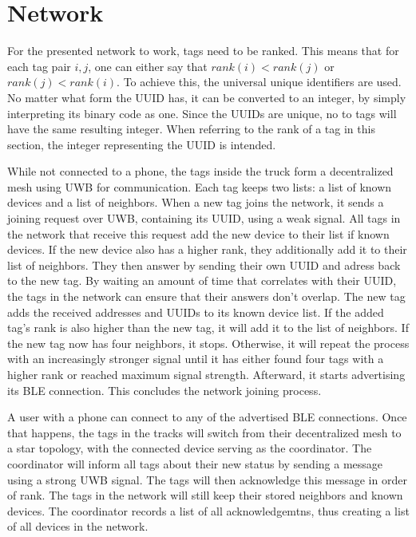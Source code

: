 \section{Network}
\label{s:network}

For the presented network to work, tags need to be ranked.
This means that for each tag pair $i,j$, one can either say that $rank(i)<rank(j)$ or $rank(j)<rank(i)$.
To achieve this, the universal unique identifiers are used.
No matter what form the UUID has, it can be converted to an integer, by simply interpreting its binary code as one.
Since the UUIDs are unique, no to tags will have the same resulting integer.
When referring to the rank of a tag in this section, the integer representing the UUID is intended.

While not connected to a phone, the tags inside the truck form a decentralized mesh using UWB for communication.
Each tag keeps two lists: a list of known devices and a list of neighbors.
When a new tag joins the network, it sends a joining request over UWB, containing its UUID, using a weak signal.
All tags in the network that receive this request add the new device to their list if known devices. 
If the new device also has a higher rank, they additionally add it to their list of neighbors.
They then answer by sending their own UUID and adress back to the new tag.
By waiting an amount of time that correlates with their UUID, the tags in the network can ensure that their answers don't overlap.
The new tag adds the received addresses and UUIDs to its known device list. If the added tag's rank is also higher than the new tag, it will add it to the list of neighbors.
If the new tag now has four neighbors, it stops. Otherwise, it will repeat the process with an increasingly stronger signal until it has either found four tags with a higher rank or reached maximum signal strength.
Afterward, it starts advertising its BLE connection.
This concludes the network joining process.


A user with a phone can connect to any of the advertised BLE connections.
Once that happens, the tags in the tracks will switch from their decentralized mesh to a star topology, with the connected device serving as the coordinator.
The coordinator will inform all tags about their new status by sending a message using a strong UWB signal.
The tags will then acknowledge this message in order of rank.
The tags in the network will still keep their stored neighbors and known devices.
The coordinator records a list of all acknowledgemtns, thus creating a list of all devices in the network.


